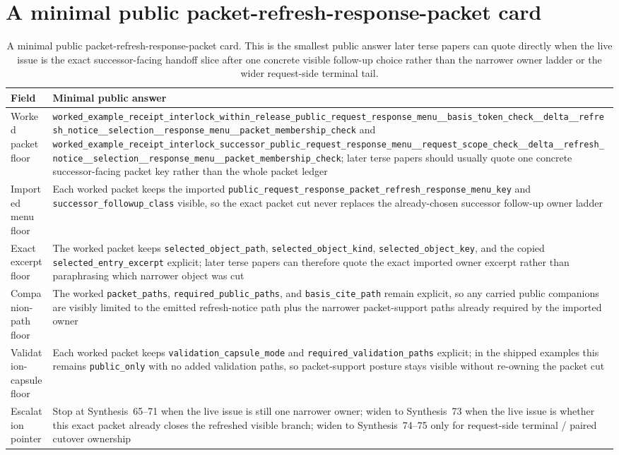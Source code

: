 \documentclass[11pt]{article}
\begin{document}
\section{A minimal public packet-refresh-response-packet card}
\begin{table}[t]
\centering
\small
\begin{tabularx}{\linewidth}{@{}lX@{}}
\toprule
Field & Minimal public answer \\
\midrule
Worked packet floor & \nolinkurl{worked_example_receipt_interlock_within_release_public_request_response_menu__basis_token_check__delta__refresh_notice__selection__response_menu__packet_membership_check} and \nolinkurl{worked_example_receipt_interlock_successor_public_request_response_menu__request_scope_check__delta__refresh_notice__selection__response_menu__packet_membership_check}; later terse papers should usually quote one concrete successor-facing packet key rather than the whole packet ledger \\
Imported menu floor & Each worked packet keeps the imported \nolinkurl{public_request_response_packet_refresh_response_menu_key} and \nolinkurl{successor_followup_class} visible, so the exact packet cut never replaces the already-chosen successor follow-up owner ladder \\
Exact excerpt floor & The worked packet keeps \nolinkurl{selected_object_path}, \nolinkurl{selected_object_kind}, \nolinkurl{selected_object_key}, and the copied \nolinkurl{selected_entry_excerpt} explicit; later terse papers can therefore quote the exact imported owner excerpt rather than paraphrasing which narrower object was cut \\
Companion-path floor & The worked \nolinkurl{packet_paths}, \nolinkurl{required_public_paths}, and \nolinkurl{basis_cite_path} remain explicit, so any carried public companions are visibly limited to the emitted refresh-notice path plus the narrower packet-support paths already required by the imported owner \\
Validation-capsule floor & Each worked packet keeps \nolinkurl{validation_capsule_mode} and \nolinkurl{required_validation_paths} explicit; in the shipped examples this remains \nolinkurl{public_only} with no added validation paths, so packet-support posture stays visible without re-owning the packet cut \\
Escalation pointer & Stop at Synthesis~65--71 when the live issue is still one narrower owner; widen to Synthesis~73 when the live issue is whether this exact packet already closes the refreshed visible branch; widen to Synthesis~74--75 only for request-side terminal / paired cutover ownership \\
\bottomrule
\end{tabularx}
\caption{A minimal public packet-refresh-response-packet card. This is the smallest public answer later terse papers can quote directly when the live issue is the exact successor-facing handoff slice after one concrete visible follow-up choice rather than the narrower owner ladder or the wider request-side terminal tail.}
\label{tab:minimal-public-packet-refresh-response-packet-card}
\end{table}
\end{document}

